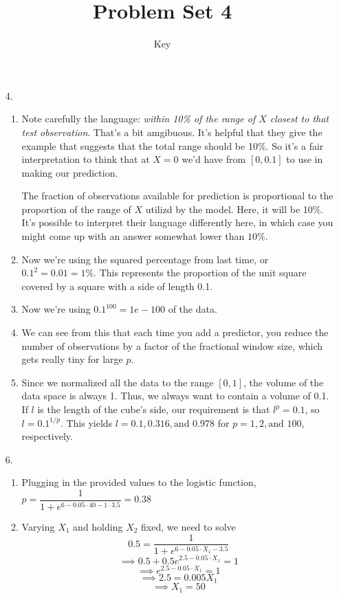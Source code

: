 \documentclass[11pt]{article}\usepackage[]{graphicx}\usepackage[]{color}
\author{Key}
\title{Problem Set 4}
\begin{document}
\maketitle
\begin{enumerate}
\item[4.]
\begin{enumerate}[label=(\alph*)]
\item Note carefully the language: \emph{within 10\% of the range of $X$ closest to that test observation}. That's a bit amgibuous. It's helpful that they give the example that suggests that the total range should be 10\%. So it's a fair interpretation to think that at $X = 0$ we'd have from $[0, 0.1]$ to use in making our prediction.

The fraction of observations available for prediction is proportional to the proportion of the range of $X$ utilizd by the model. Here, it will be 10\%. It's possible to interpret their language differently here, in which case you might come up with an answer somewhat lower than $10\%$.
\item Now we're using the squared percentage from last time, or $0.1^2 = 0.01 = 1\%$. This represents the proportion of the unit square covered by a square with a side of length 0.1.
\item Now we're using $0.1^100 = 1e-100$ of the data.
\item We can see from this that each time you add a predictor, you reduce the number of observations by a factor of the fractional window size, which gets really tiny for large $p$.
\item Since we normalized all the data to the range $[0,1]$, the volume of the data space is always 1. Thus, we always want to contain a volume of 0.1. If $l$ is the length of the cube's side, our requirement is that $l^p = 0.1$, so $l = 0.1^{1/p}$. This yields $l = 0.1, 0.316, \textrm{and } 0.978$ for $p = 1, 2, \textrm{and } 100$, respectively.
\end{enumerate}
\item[6.]
\begin{enumerate}[label=(\alph*)]
\item Plugging in the provided values to the logistic function, $p=\dfrac{1}{1+e^{6-0.05\cdot 40 - 1 \cdot 3.5}} = 0.38$
\item Varying $X_1$ and holding $X_2$ fixed, we need to solve
\[ 0.5 = \dfrac{1}{1+e^{6 - 0.05 \cdot X_1 - 3.5}} \]
\[ \implies 0.5 + 0.5 e^{2.5 - 0.05 \cdot X_1 } = 1 \]
\[ \implies e^{2.5 - 0.05 \cdot X_1 } = 1\]
\[ \implies 2.5 = 0.005 X_1\]
\[ \implies X_1 = 50\]
\end{enumerate}


\end{enumerate}
\end{document}
